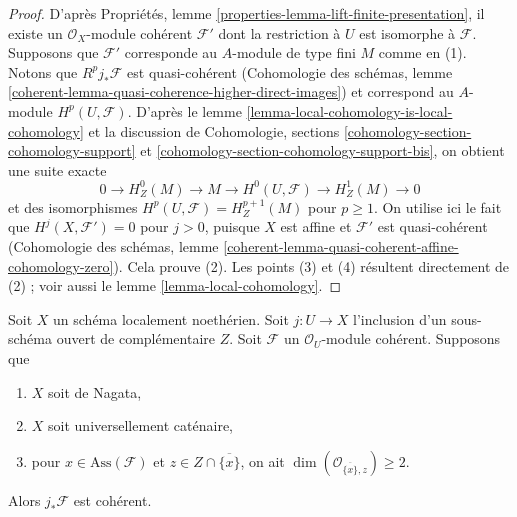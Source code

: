 \begin{proof}
D'après Propriétés, lemme \ref{properties-lemma-lift-finite-presentation}, il existe un $\mathcal{O}_X$-module cohérent $\mathcal{F}'$ dont la restriction à $U$ est isomorphe à $\mathcal{F}$. Supposons que $\mathcal{F}'$ corresponde au $A$-module de type fini $M$ comme en (1). Notons que $R^pj_*\mathcal{F}$ est quasi-cohérent (Cohomologie des schémas, lemme \ref{coherent-lemma-quasi-coherence-higher-direct-images}) et correspond au $A$-module $H^p(U, \mathcal{F})$. D'après le lemme \ref{lemma-local-cohomology-is-local-cohomology} et la discussion de Cohomologie, sections \ref{cohomology-section-cohomology-support} et \ref{cohomology-section-cohomology-support-bis}, on obtient une suite exacte
$$
0 \to H^0_Z(M) \to M \to H^0(U, \mathcal{F}) \to H^1_Z(M) \to 0
$$
et des isomorphismes $H^p(U, \mathcal{F}) = H^{p + 1}_Z(M)$ pour $p \geq 1$. On utilise ici le fait que $H^j(X, \mathcal{F}') = 0$ pour $j > 0$, puisque $X$ est affine et $\mathcal{F}'$ est quasi-cohérent (Cohomologie des schémas, lemme \ref{coherent-lemma-quasi-coherent-affine-cohomology-zero}). Cela prouve (2). Les points (3) et (4) résultent directement de (2) ; voir aussi le lemme \ref{lemma-local-cohomology}.
\end{proof}

\begin{lemma}
\label{lemma-finiteness-pushforward}
Soit $X$ un schéma localement noethérien. Soit $j : U \to X$ l'inclusion d'un sous-schéma ouvert de complémentaire $Z$. Soit $\mathcal{F}$ un $\mathcal{O}_U$-module cohérent. Supposons que
\begin{enumerate}
\item $X$ soit de Nagata,
\item $X$ soit universellement caténaire,
\item pour $x \in \text{Ass}(\mathcal{F})$ et $z \in Z \cap \overline{\{x\}}$, on ait $\dim(\mathcal{O}_{\overline{\{x\}}, z}) \geq 2$.
\end{enumerate}
Alors $j_*\mathcal{F}$ est cohérent.
\end{lemma}

